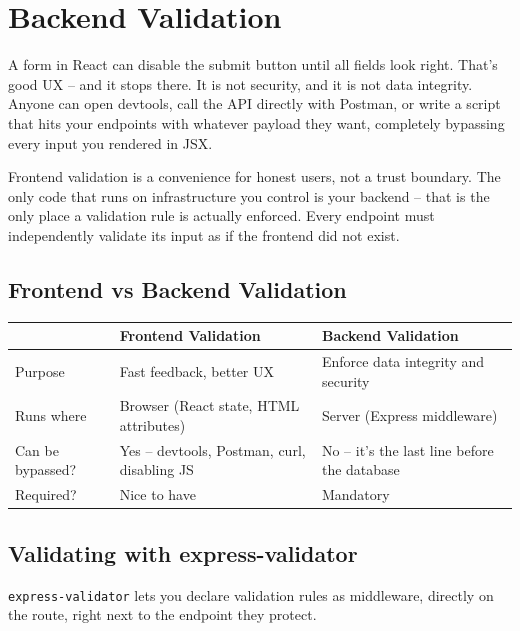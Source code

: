 \chapter{Backend Validation}

A form in React can disable the submit button until all fields look right.
That's good UX -- and it stops there. It is not security, and it is not
data integrity. Anyone can open devtools, call the API directly with
Postman, or write a script that hits your endpoints with whatever payload
they want, completely bypassing every input you rendered in JSX.

\begin{warnbox}[WARNING]
Frontend validation is a convenience for honest users, not a trust boundary.
The only code that runs on infrastructure you control is your backend --
that is the only place a validation rule is actually enforced. Every
endpoint must independently validate its input as if the frontend did not
exist.
\end{warnbox}

\section{Frontend vs Backend Validation}

\begin{center}
\begin{tabularx}{\textwidth}{lXX}
\toprule
\textbf{} & \textbf{Frontend Validation} & \textbf{Backend Validation} \\
\midrule
Purpose & Fast feedback, better UX & Enforce data integrity and security \\
Runs where & Browser (React state, HTML attributes) & Server (Express middleware) \\
Can be bypassed? & Yes -- devtools, Postman, curl, disabling JS & No -- it's the last line before the database \\
Required? & Nice to have & Mandatory \\
\bottomrule
\end{tabularx}
\end{center}

\section{Validating with express-validator}

\texttt{express-validator} lets you declare validation rules as middleware,
directly on the route, right next to the endpoint they protect.

